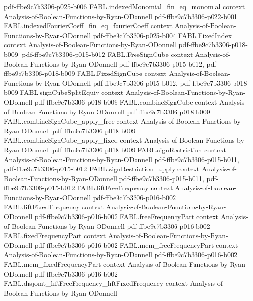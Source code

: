 \begin{theorem}
  {pdf-ffbe9c7b3306-p025-b006}
\proofstep
  {FABL.indexedMonomial_fin_eq_monomial}
  {context}
  {Analysis-of-Boolean-Functions-by-Ryan-ODonnell}
  {pdf-ffbe9c7b3306-p022-b001}
\proofstep
  {FABL.indexedFourierCoeff_fin_eq_fourierCoeff}
  {context}
  {Analysis-of-Boolean-Functions-by-Ryan-ODonnell}
  {pdf-ffbe9c7b3306-p025-b004}
\proofstep
  {FABL.FixedIndex}
  {context}
  {Analysis-of-Boolean-Functions-by-Ryan-ODonnell}
  {pdf-ffbe9c7b3306-p018-b009,
    pdf-ffbe9c7b3306-p015-b012}
\proofstep
  {FABL.FreeSignCube}
  {context}
  {Analysis-of-Boolean-Functions-by-Ryan-ODonnell}
  {pdf-ffbe9c7b3306-p015-b012,
    pdf-ffbe9c7b3306-p018-b009}
\proofstep
  {FABL.FixedSignCube}
  {context}
  {Analysis-of-Boolean-Functions-by-Ryan-ODonnell}
  {pdf-ffbe9c7b3306-p015-b012,
    pdf-ffbe9c7b3306-p018-b009}
\proofstep
  {FABL.signCubeSplitEquiv}
  {context}
  {Analysis-of-Boolean-Functions-by-Ryan-ODonnell}
  {pdf-ffbe9c7b3306-p018-b009}
\proofstep
  {FABL.combineSignCube}
  {context}
  {Analysis-of-Boolean-Functions-by-Ryan-ODonnell}
  {pdf-ffbe9c7b3306-p018-b009}
\proofstep
  {FABL.combineSignCube_apply_free}
  {context}
  {Analysis-of-Boolean-Functions-by-Ryan-ODonnell}
  {pdf-ffbe9c7b3306-p018-b009}
\proofstep
  {FABL.combineSignCube_apply_fixed}
  {context}
  {Analysis-of-Boolean-Functions-by-Ryan-ODonnell}
  {pdf-ffbe9c7b3306-p018-b009}
\proofstep
  {FABL.signRestriction}
  {context}
  {Analysis-of-Boolean-Functions-by-Ryan-ODonnell}
  {pdf-ffbe9c7b3306-p015-b011,
    pdf-ffbe9c7b3306-p015-b012}
\proofstep
  {FABL.signRestriction_apply}
  {context}
  {Analysis-of-Boolean-Functions-by-Ryan-ODonnell}
  {pdf-ffbe9c7b3306-p015-b011,
    pdf-ffbe9c7b3306-p015-b012}
\proofstep
  {FABL.liftFreeFrequency}
  {context}
  {Analysis-of-Boolean-Functions-by-Ryan-ODonnell}
  {pdf-ffbe9c7b3306-p016-b002}
\proofstep
  {FABL.liftFixedFrequency}
  {context}
  {Analysis-of-Boolean-Functions-by-Ryan-ODonnell}
  {pdf-ffbe9c7b3306-p016-b002}
\proofstep
  {FABL.freeFrequencyPart}
  {context}
  {Analysis-of-Boolean-Functions-by-Ryan-ODonnell}
  {pdf-ffbe9c7b3306-p016-b002}
\proofstep
  {FABL.fixedFrequencyPart}
  {context}
  {Analysis-of-Boolean-Functions-by-Ryan-ODonnell}
  {pdf-ffbe9c7b3306-p016-b002}
\proofstep
  {FABL.mem_freeFrequencyPart}
  {context}
  {Analysis-of-Boolean-Functions-by-Ryan-ODonnell}
  {pdf-ffbe9c7b3306-p016-b002}
\proofstep
  {FABL.mem_fixedFrequencyPart}
  {context}
  {Analysis-of-Boolean-Functions-by-Ryan-ODonnell}
  {pdf-ffbe9c7b3306-p016-b002}
\proofstep
  {FABL.disjoint_liftFreeFrequency_liftFixedFrequency}
  {context}
  {Analysis-of-Boolean-Functions-by-Ryan-ODonnell}

\end{theorem}

